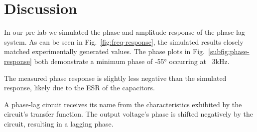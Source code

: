 \clearpage		%
\section{Discussion}\label{sec:discussion}
In our pre-lab we simulated the phase and amplitude response of the phase-lag system.
As can be seen in Fig.~\ref{fig:freq-response}, the simulated results closely matched experimentally generated values.
The phase plots in Fig.~\ref{subfig:phase-response} both demonstrate a minimum phase of -55\si{\degree} occurring at ~3kHz.

The measured phase response is slightly less negative than the simulated response, likely due to the ESR of the capacitors.

A phase-lag circuit receives its name from the characteristics exhibited by the circuit's transfer function.
The output voltage's phase is shifted negatively by the circuit, resulting in a lagging phase.
